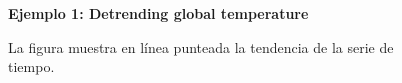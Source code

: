 
\begin{figure}[h!]
	\centering
	\textbf{Ejemplo 1: Detrending global temperature}\par\medskip
	\caption{La figura muestra en línea punteada la tendencia de la serie de tiempo.}\label{fig1}
\end{figure}


